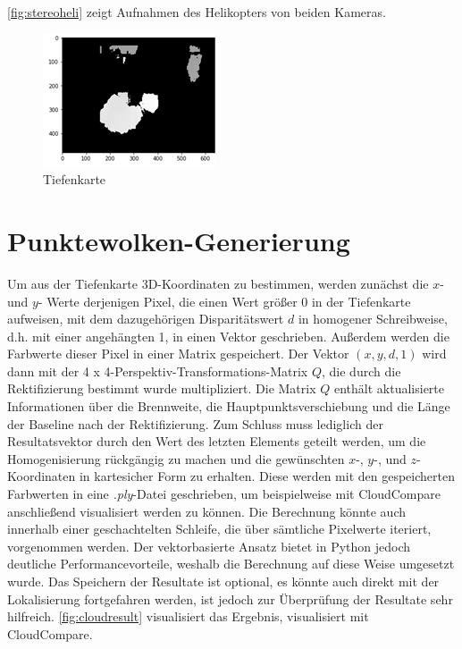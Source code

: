 \noindent \ref{fig:stereoheli} zeigt Aufnahmen des Helikopters von beiden Kameras.

\begin{figure}[H]
	\includegraphics[scale=2.0]{bilder/Tiefenkarte}
	\caption[Tiefenkarte]{Tiefenkarte}
	\label{fig:tiefenkarte}%
\end{figure}

\section{Punktewolken-Generierung} 
\label{sec:pointgen}

Um aus der Tiefenkarte 3D-Koordinaten zu bestimmen, werden zunächst die $x$- und $y$- Werte derjenigen Pixel, die einen Wert größer 0 in der Tiefenkarte aufweisen, mit dem dazugehörigen Disparitätswert $d$ in homogener Schreibweise, d.h. mit einer angehängten 1, in einen Vektor geschrieben. Außerdem werden die Farbwerte dieser Pixel in einer Matrix gespeichert. Der Vektor $(x, y, d, 1)$ wird dann mit der 4 x 4-Perspektiv-Transformations-Matrix $Q$, die durch die Rektifizierung bestimmt wurde multipliziert. Die Matrix $Q$ enthält aktualisierte Informationen über die Brennweite, die Hauptpunktsverschiebung und die Länge der Baseline nach der Rektifizierung. Zum Schluss muss lediglich der Resultatsvektor durch den Wert des letzten Elements geteilt werden, um die Homogenisierung rückgängig zu machen und die gewünschten $x$-, $y$-, und $z$-Koordinaten in kartesicher Form zu erhalten. Diese werden mit den gespeicherten Farbwerten in eine \textit{.ply}-Datei geschrieben, um beispielweise mit CloudCompare anschließend visualisiert werden zu können.\newline
Die Berechnung könnte auch innerhalb einer geschachtelten Schleife, die über sämtliche Pixelwerte iteriert, vorgenommen werden. Der vektorbasierte Ansatz bietet in Python jedoch deutliche Performancevorteile, weshalb die Berechnung auf diese Weise umgesetzt wurde. Das Speichern der Resultate ist optional, es könnte auch direkt mit der Lokalisierung fortgefahren werden, ist jedoch zur Überprüfung der Resultate sehr hilfreich. \ref{fig:cloudresult} visualisiert das Ergebnis, visualisiert mit CloudCompare.

